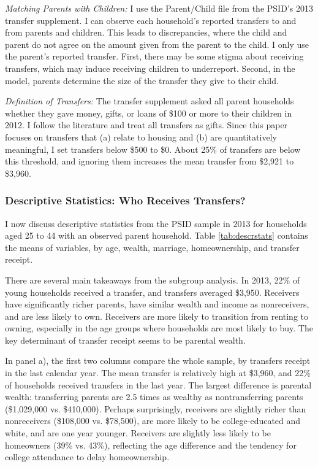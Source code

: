 \documentclass[12pt]{article}
\begin{document}
\textit{Matching Parents with Children:} I use the Parent/Child file from the PSID's 2013 transfer supplement. I can observe each household's reported transfers to and from parents and children. This leads to discrepancies, where the child and parent do not agree on the amount given from the parent to the child. I only use the parent's reported transfer. First, there may be some stigma about receiving transfers, which may induce receiving children to underreport. Second, in the model, parents determine the size of the transfer they give to their child. 

\textit{Definition of Transfers:} The transfer supplement asked all parent households whether they gave money, gifts, or loans of \$100 or more to their children in 2012. I follow the literature \citep[e.g.,][]{mcgarry2016dynamic} and treat all transfers as gifts. Since this paper focuses on transfers that (a) relate to housing and (b) are quantitatively meaningful, I set transfers below \$500 to \$0. About 25\% of transfers are below this threshold, and ignoring them increases the mean transfer from \$2,921 to \$3,960.

\subsubsection{Descriptive Statistics: Who Receives Transfers?}
I now discuss descriptive statistics from the PSID sample in 2013 for households aged 25 to 44 with an observed parent household. Table \ref{tab:descrstats} contains the means of variables, by age, wealth, marriage, homeownership, and transfer receipt.

There are several main takeaways from the subgroup analysis. In 2013, 22\% of young households received a transfer, and transfers averaged \$3,950. Receivers have significantly richer parents, have similar wealth and income as nonreceivers, and are less likely to own. Receivers are more likely to transition from renting to owning, especially in the age groups where households are most likely to buy. The key determinant of transfer receipt seems to be parental wealth.

In panel a), the first two columns compare the whole sample, by transfers receipt in the last calendar year. The mean transfer is relatively high at \$3,960, and 22\% of households received transfers in the last year. The largest difference is parental wealth: transferring parents are 2.5 times as wealthy as nontransferring parents (\$1,029,000 vs. \$410,000). Perhaps surprisingly, receivers are slightly richer than nonreceivers (\$108,000 vs. \$78,500), are more likely to be college-educated and white, and are one year younger. Receivers are slightly less likely to be homeowners (39\% vs. 43\%), reflecting the age difference and the tendency for college attendance to delay homeownership.
\end{document}
